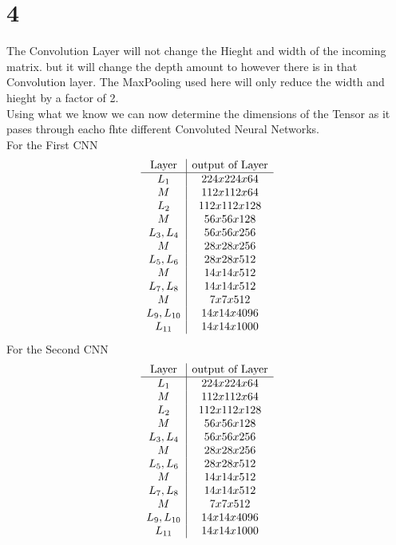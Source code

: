\documentclass[12pt,english]{article}
\begin{document}
\section*{4}
The Convolution Layer will not change the Hieght and width of the incoming matrix. but it will change the depth amount to however there is in that Convolution layer. The MaxPooling used here will only reduce the width and hieght by a factor of 2.\\
Using what we know we can now determine the dimensions of the Tensor as it pases through eacho fhte different Convoluted Neural Networks.\\
For the First CNN
\begin{equation*}
\begin{array}{c|c}
 \hbox{Layer}& \hbox{output of Layer}  \\
\hline
L_1 & 224x224x64 \\
M & 112x112x64 \\
L_2 & 112x112x128 \\
M & 56x56x128 \\
L_3,L_4 & 56x56x256 \\
M & 28x28x256\\
L_5,L_6 & 28x28x512 \\
M & 14x14x512\\
L_7,L_8 & 14x14x512 \\
M & 7x7x512\\
L_9,L_{10} & 14x14x4096 \\
L_{11} & 14x14x1000 
\end{array} 
\end{equation*}
For the Second CNN
\begin{equation*}
\begin{array}{c|c}
 \hbox{Layer}& \hbox{output of Layer}  \\
\hline
L_1 & 224x224x64 \\
M & 112x112x64 \\
L_2 & 112x112x128 \\
M & 56x56x128 \\
L_3,L_4 & 56x56x256 \\
M & 28x28x256\\
L_5,L_6 & 28x28x512 \\
M & 14x14x512\\
L_7,L_8 & 14x14x512 \\
M & 7x7x512\\
L_9,L_{10} & 14x14x4096 \\
L_{11} & 14x14x1000 
\end{array} 
\end{equation*}
\end{document}
